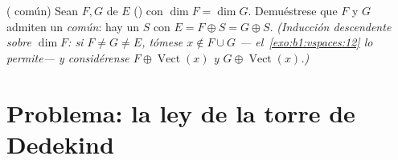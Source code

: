 \begin{exercise}[$\star\star\star$]\label{exo:b1:findim:12}
( común) Sean $F, G$  de $E$ () con $\dim F = \dim G$. Demuéstrese que $F$ y $G$
admiten un  \emph{común}: hay un  $S$ con
$E = F \oplus S = G \oplus S$. \emph{(Inducción descendente sobre
$\dim F$: si $F \neq G \neq E$, tómese $x \notin F \cup G$ ---
el~\cref{exo:b1:vspaces:12} lo permite--- y considérense
$F \oplus \operatorname{Vect}(x)$ y $G \oplus \operatorname{Vect}(x)$.)}
\end{exercise}

\section{Problema: la ley de la torre de Dedekind}

